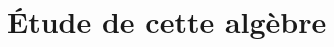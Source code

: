 \documentclass[french]{article}
\theoremstyle{definition}
\theoremstyle{plain}
\newtheorem{Prop}[defi]{Proposition}
\newcommand{\e}{\varepsilon}
\newcommand{\K}{\mathbb{K}}
\DeclareMathOperator{\dDsh}{\overline{\Delta_{\shuffle}}}
\DeclareMathOperator{\FTBD}{\mathcal{FTBD}}
\DeclareMathOperator{\TTBD}{\mathcal{TTBD}}
\begin{document}
\section{\'Etude de cette algèbre \PH{}}
% 
% 
%
%		
\end{document}
